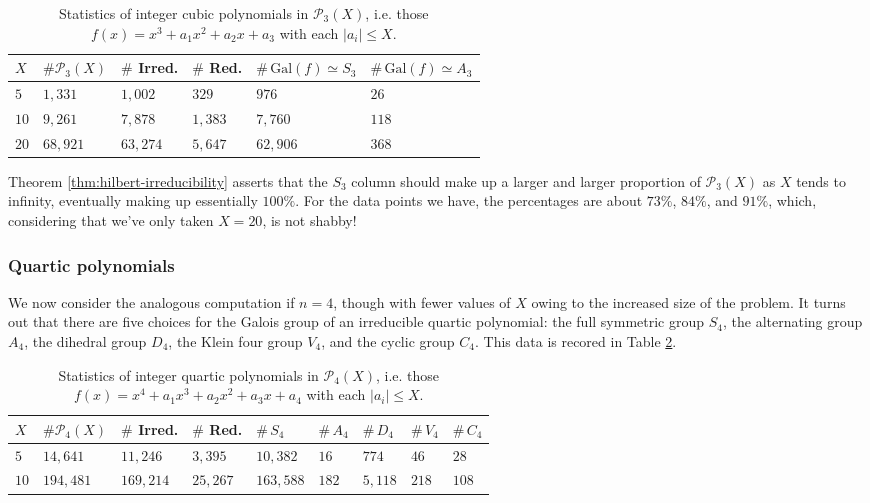 \documentclass[12pt]{amsart}
\theoremstyle{definition} \newtheorem*{notation}{Notation}
\theoremstyle{remark} \newtheorem*{remark}{Remark}
\theoremstyle{remark} \newtheorem*{example}{Example}
\theoremstyle{definition} \newtheorem*{definition}{Definition}
\numberwithin{equation}{section}
\numberwithin{theorem}{section}
\begin{document}
	\begin{table}[h] \label{tbl:hilbert-cubic}
		\begin{tabular}{|l|l||l|l||l|l|}
			\hline $X$ & $\#\mathcal{P}_3(X)$ & $\#$ Irred. & $\#$ Red. & $\#\,\mathrm{Gal}(f) \simeq S_3$ & $\#\,\mathrm{Gal}(f) \simeq A_3$ \\ \hline
			$5$ & $1{,}331$ & $1{,}002$ & $329$ & $976$ & $26$ \\
			$10$ & $9{,}261$ & $7{,}878$ & $1{,}383$ & $7{,}760$ & $118$ \\
			$20$ & $68{,}921$ & $63{,}274$ & $5{,}647$ & $62{,}906$ & $368$ \\ \hline			
		\end{tabular}
		\caption{
			Statistics of integer cubic polynomials in $\mathcal{P}_3(X)$, i.e. those $f(x) = x^3 + a_1x^2 + a_2x + a_3$ with each $|a_i| \leq X$.
		}
	\end{table}
	
	Theorem \ref{thm:hilbert-irreducibility} asserts that the $S_3$ column should make up a larger and larger proportion of $\mathcal{P}_3(X)$ as $X$ tends to infinity, eventually making up essentially $100\%$.  For the data points we have, the percentages are about $73\%$, $84\%$, and $91\%$, which, considering that we've only taken $X=20$, is not shabby!
	
	\subsubsection{Quartic polynomials}  We now consider the analogous computation if $n=4$, though with fewer values of $X$ owing to the increased size of the problem.  It turns out that there are five choices for the Galois group of an irreducible quartic polynomial: the full symmetric group $S_4$, the alternating group $A_4$, the dihedral group $D_4$, the Klein four group $V_4$, and the cyclic group $C_4$.  This data is recored in Table \ref{tbl:hilbert-quartic}.

	\begin{table}[h] \label{tbl:hilbert-quartic}
		\begin{tabular}{|l|l||l|l||l|l|l|l|l|}
			\hline $X$ & $\#\mathcal{P}_4(X)$ & $\#$ Irred. & $\#$ Red. & $\#\,S_4$ & $\#\,A_4$ & $\#\,D_4$ & $\#\,V_4$ & $\#\,C_4$ \\ \hline
			$5$ & $14{,}641$ & $11{,}246$ & $3{,}395$ & $10{,}382$ & $16$ & $774$ & $46$ & $28$ \\
			$10$ & $194{,}481$ & $169{,}214$ & $25{,}267$ & $163{,}588$ & $182$ & $5{,}118$ & $218$ & $108$ \\ \hline
		\end{tabular}
		\caption{
			Statistics of integer quartic polynomials in $\mathcal{P}_4(X)$, i.e. those $f(x) = x^4 + a_1x^3 + a_2x^2 + a_3x + a_4$ with each $|a_i| \leq X$.
		}
	\end{table}
\end{document}
